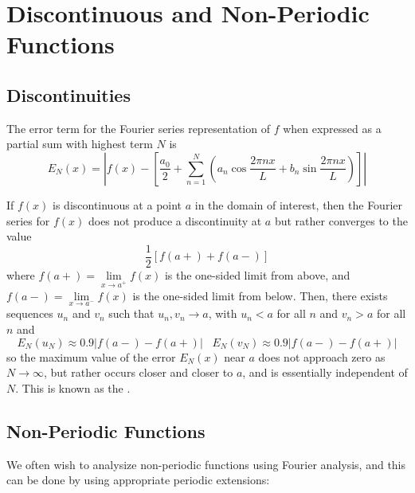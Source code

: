 \documentclass[12pt, a4paper, oneside, openright, titlepage]{book}
\begin{document}
\section{Discontinuous and Non-Periodic Functions}

\subsection{Discontinuities}

\begin{defn}
    The error term for the Fourier series representation of $f$ when expressed as a partial sum with highest term $N$ is \begin{equation*}
        E_N(x) = \left|f(x) - \left[\frac{a_0}{2}+\sum_{n=1}^N\left(a_n\cos\frac{2\pi nx}{L}+b_n\sin\frac{2\pi nx}{L}\right)\right]\right|
    \end{equation*}
\end{defn}

If $f(x)$ is discontinuous at a point $a$ in the domain of interest, then the Fourier series for $f(x)$ does not produce a discontinuity at $a$ but rather converges to the value \begin{equation*}
    \frac{1}{2}[f(a+)+f(a-)]
\end{equation*}
where $f(a+) = \lim\limits_{x\rightarrow a^+}f(x)$ is the one-sided limit from above, and $f(a-) = \lim\limits_{x\rightarrow a^-}f(x)$ is the one-sided limit from below. Then, there exists sequences $u_n$ and $v_n$ such that $u_n,v_n\rightarrow a$, with $u_n < a$ for all $n$ and $v_n > a$ for all $n$ and \begin{equation*}
    E_N(u_N) \approx 0.9|f(a-)-f(a+)|\;\;\;E_N(v_N) \approx 0.9|f(a-)-f(a+)|
\end{equation*}
so the maximum value of the error $E_N(x)$ near $a$ does not approach zero as $N\rightarrow \infty$, but rather occurs closer and closer to $a$, and is essentially independent of $N$. This is known as the .


\subsection{Non-Periodic Functions}

We often wish to analysize non-periodic functions using Fourier analysis, and this can be done by using appropriate periodic extensions:
\end{document}

